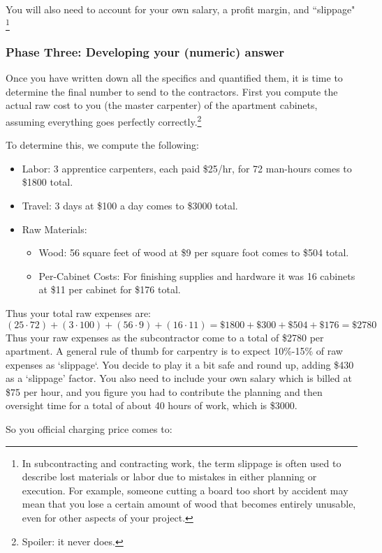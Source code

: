 {You will also need to account for your own salary, a profit margin, and ``slippage"
\footnote{In subcontracting and contracting work, the term slippage is often used to describe lost materials or labor due to mistakes in either planning or execution. For example, someone cutting a board too short by accident may mean that you lose a certain amount of wood that becomes entirely unusable, even for other aspects of your project.}

\subsubsection*{Phase Three: Developing your (numeric) answer}
Once you have written down all the specifics and quantified them, it is time to determine the final number to send to the contractors. First you compute the actual raw cost to you (the master carpenter) of the apartment cabinets, assuming everything goes perfectly correctly.\footnote{Spoiler: it never does.}

To determine this, we compute the following:
\begin{itemize}
\item Labor: 3 apprentice carpenters, each paid \$25/hr, for 72 man-hours comes to \$1800 total.
\item Travel: 3 days at \$100 a day comes to \$3000 total.
\item Raw Materials:
    \begin{itemize}
    \item Wood: 56 square feet of wood at \$9 per square foot comes to \$504 total.
    \item Per-Cabinet Costs: For finishing supplies and hardware it was 16 cabinets at \$11 per cabinet for \$176 total.
    \end{itemize}
\end{itemize}
Thus your total raw expenses are:
\[
(25\cdot 72) + (3\cdot 100) + (56\cdot 9) + (16\cdot 11) = \$1800 + \$300 + \$504 + \$176 = \$2780
\]
Thus your raw expenses as the subcontractor come to a total of \$2780 per apartment. A general rule of thumb for carpentry is to expect 10\%-15\% of raw expenses as `slippage`. You decide to play it a bit safe and round up, adding \$430 as a `slippage' factor. You also need to include your own salary which is billed at \$75 per hour, and you figure you had to contribute the planning and then oversight time for a total of about 40 hours of work, which is \$3000.

So you official charging price comes to:

}
